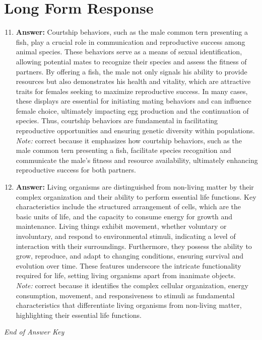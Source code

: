 \documentclass[12pt]{article}
\begin{document}
\section*{Long Form Response}
\begin{enumerate}[label=\arabic*.]
\setcounter{enumi}{10}
\item \textbf{Answer:} Courtship behaviors, such as the male common tern presenting a fish, play a crucial role in communication and reproductive success among animal species. These behaviors serve as a means of sexual identification, allowing potential mates to recognize their species and assess the fitness of partners. By offering a fish, the male not only signals his ability to provide resources but also demonstrates his health and vitality, which are attractive traits for females seeking to maximize reproductive success. In many cases, these displays are essential for initiating mating behaviors and can influence female choice, ultimately impacting egg production and the continuation of species. Thus, courtship behaviors are fundamental in facilitating reproductive opportunities and ensuring genetic diversity within populations.
\\ \textit{Note:} correct because it emphasizes how courtship behaviors, such as the male common tern presenting a fish, facilitate species recognition and communicate the male's fitness and resource availability, ultimately enhancing reproductive success for both partners.
\item \textbf{Answer:} Living organisms are distinguished from non-living matter by their complex organization and their ability to perform essential life functions. Key characteristics include the structured arrangement of cells, which are the basic units of life, and the capacity to consume energy for growth and maintenance. Living things exhibit movement, whether voluntary or involuntary, and respond to environmental stimuli, indicating a level of interaction with their surroundings. Furthermore, they possess the ability to grow, reproduce, and adapt to changing conditions, ensuring survival and evolution over time. These features underscore the intricate functionality required for life, setting living organisms apart from inanimate objects.
\\ \textit{Note:} correct because it identifies the complex cellular organization, energy consumption, movement, and responsiveness to stimuli as fundamental characteristics that differentiate living organisms from non-living matter, highlighting their essential life functions.
\end{enumerate}

\vfill
\noindent\textit{End of Answer Key}
\end{document}
